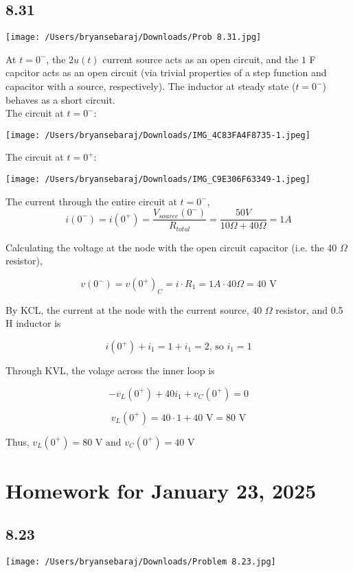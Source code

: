 \documentclass{article}
\begin{document}
\subsection*{8.31}

\texttt{[image: /Users/bryansebaraj/Downloads/Prob 8.31.jpg]}

At $t=0^-$, the $2u(t)$ current source acts as an open circuit, and the $1 $ F capcitor acts as an open circuit (via trivial properties of a step function and capacitor with a source, respectively). The inductor at steady state ($t=0^-$) behaves as a short circuit. \\ 

The circuit at $t=0^-$:

\texttt{[image: /Users/bryansebaraj/Downloads/IMG\_4C83FA4F8735-1.jpeg]}

The circuit at $t=0^+$: 

\texttt{[image: /Users/bryansebaraj/Downloads/IMG\_C9E306F63349-1.jpeg]}

The current through the entire circuit at $t=0^-$, $$i(0^-)= i(0^+)=\frac{V_{source}(0^-)}{R_{total}}=\frac{50 V}{10 \Omega + 40 \Omega}=1 A$$

Calculating the voltage at the node with the open circuit capacitor (i.e. the 40 $\Omega$ resistor), 

$$v(0^-) = v(0^+)_C= i \cdot R_1 = 1 A \cdot 40 \Omega= 40 \text{ V}$$

By KCL, the current at the node with the current source, 40 $\Omega$ resistor, and 0.5 H inductor is 

$$i(0^+) + i_1= 1 + i_1 = 2 \text{, so } i_1 = 1$$

Through KVL, the volage across the inner loop is 

$$-v_L(0^+) + 40i_1 + v_C(0^+)=0$$

$$v_L(0^+)= 40 \cdot 1 + 40 \text{ V} = 80 \text{ V}$$

Thus, $v_L(0^+)=80 \text{ V and } v_C(0^+)=40 \text{ V}$

\section*{Homework for January 23, 2025}

\subsection*{8.23}

\texttt{[image: /Users/bryansebaraj/Downloads/Problem 8.23.jpg]}
\end{document}
